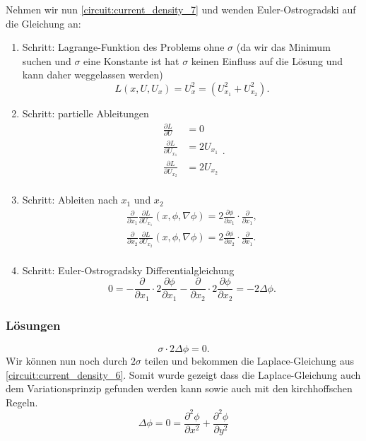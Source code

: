 Nehmen wir nun \eqref{circuit:current_density_7} und wenden Euler-Ostrogradski auf die Gleichung an:
\begin{enumerate}
	\item Schritt: Lagrange-Funktion des Problems ohne $\sigma$ (da wir das Minimum suchen und $\sigma$ eine Konstante ist hat $\sigma$ keinen Einfluss auf die Lösung und kann daher weggelassen werden)
	\begin{equation}
		L(x, U, U_x)= U_x^2 = (U_{x_1}^2+U_{x_2}^2).
	\end{equation}
	\item Schritt: partielle Ableitungen
	\begin{equation}
		\begin{aligned}
			\frac{\partial L}{\partial U}&=0\\
			\frac{\partial L}{\partial U_{x_1}}&=2U_{x_1}\\
			\frac{\partial L}{\partial U_{x_2}}&=2U_{x_2}\\
		\end{aligned}.
	\end{equation}
	\item Schritt: Ableiten nach $x_1$ und $x_2$
	\begin{equation}
		\begin{aligned}
			\frac{\partial}{\partial x_1}\frac{\partial L}{\partial U_{x_1}}(x,\phi,\nabla \phi)=2\frac{\partial \phi}{\partial {x_1}}\cdot \frac{\partial}{\partial x_1},\\
			\frac{\partial}{\partial x_2}\frac{\partial L}{\partial U_{x_2}}(x,\phi,\nabla \phi)=2\frac{\partial \phi}{\partial {x_2}} \cdot \frac{\partial}{\partial x_1}.\\
		\end{aligned}
	\end{equation}
	\item Schritt: Euler-Ostrogradsky Differentialgleichung
	\begin{equation}
		0=-\frac{\partial}{\partial x_1}\cdot 2\frac{\partial \phi}{\partial {x_1}}-\frac{\partial}{\partial x_2}\cdot 2\frac{\partial \phi}{\partial {x_2}}=-2\Delta\phi.
	\end{equation}
\end{enumerate}
\subsubsection{Lösungen}
	\begin{equation}
	\sigma \cdot 2\Delta\phi=0.
	\end{equation}
Wir können nun noch durch $2\sigma$ teilen und bekommen die Laplace-Gleichung aus \eqref{circuit:current_density_6}. Somit wurde gezeigt dass die Laplace-Gleichung auch dem Variationsprinzip gefunden werden kann sowie auch mit den kirchhoffschen Regeln.
	\begin{equation}
	\Delta\phi=0=\frac{\partial^2\phi}{\partial x^2}+\frac{\partial^2\phi}{\partial y^2}
	\label{circuit:laplace1}
	\end{equation}


